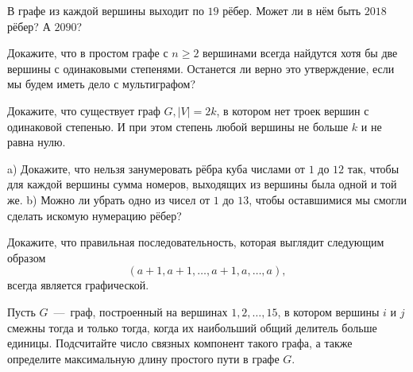 \begin{exersize}
	В графе из каждой вершины выходит по $19$ рёбер. Может ли в нём быть $2018$ рёбер? А $2090$?
\end{exersize}

\begin{exersize}
	Докажите, что в простом графе с $n \geqslant 2$ вершинами всегда найдутся хотя бы две вершины с одинаковыми степенями. Останется ли верно это утверждение, если мы будем иметь дело с мультиграфом?
\end{exersize}

\begin{exersize}
	Докажите, что существует граф $G, |V| = 2k$, в котором нет троек вершин с одинаковой степенью. И при этом степень любой вершины не больше $k$ и не равна нулю.
\end{exersize}

\begin{exersize}
	a) Докажите, что нельзя занумеровать рёбра куба числами от $1$ до $12$ так, чтобы для каждой вершины сумма номеров, выходящих из вершины была одной и той же. b) Можно ли убрать одно из чисел от $1$ до $13$, чтобы оставшимися мы смогли сделать искомую нумерацию рёбер?
\end{exersize}

\begin{exersize}
	Докажите, что правильная последовательность, которая выглядит следующим образом
	 $$(a+1, a+1, \dots, a+1, a, \dots, a),$$
	 всегда является графической.
\end{exersize}

\begin{exersize}
	Пусть $G$~---~граф, построенный на вершинах $1, 2, \dots, 15$, в котором вершины $i$ и $j$ смежны тогда и только тогда, когда их наибольший общий делитель больше единицы. Подсчитайте число связных компонент такого графа, а также определите максимальную длину простого пути в графе $G$.
\end{exersize}
